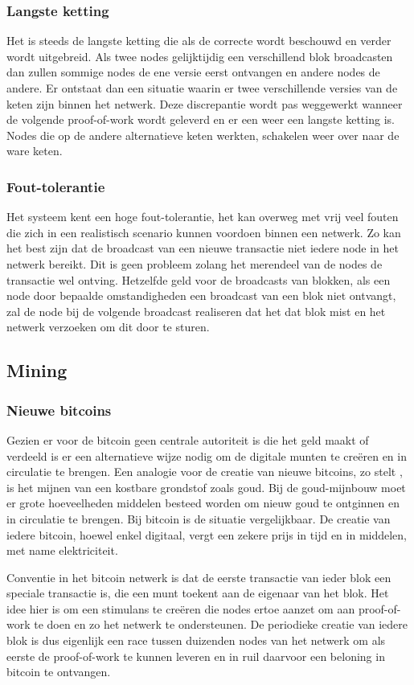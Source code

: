 		\subsubsection{Langste ketting}
		Het is steeds de langste ketting die als de correcte wordt beschouwd en verder wordt uitgebreid. Als twee nodes gelijktijdig een verschillend blok broadcasten dan zullen sommige nodes de ene versie eerst ontvangen en andere nodes de andere. Er ontstaat dan een situatie waarin er twee verschillende versies van de keten zijn binnen het netwerk. Deze discrepantie wordt pas weggewerkt wanneer de volgende proof-of-work wordt geleverd en er een weer een langste ketting is. Nodes die op de andere alternatieve keten werkten, schakelen weer over naar de ware keten.
		\subsubsection{Fout-tolerantie}
		Het systeem kent een hoge fout-tolerantie, het kan overweg met vrij veel fouten die zich in een realistisch scenario  kunnen voordoen binnen een netwerk. Zo kan het best zijn dat de broadcast van een nieuwe transactie niet iedere node in het netwerk bereikt. Dit is geen probleem zolang het merendeel van de nodes de transactie wel ontving. Hetzelfde geld voor de broadcasts van blokken, als een node door bepaalde omstandigheden een broadcast van een blok niet ontvangt, zal de node bij de volgende broadcast realiseren dat het dat blok mist en het netwerk verzoeken om dit door te sturen.
	\subsection{Mining}
		\subsubsection{Nieuwe bitcoins}
		Gezien er voor de bitcoin geen centrale autoriteit is die het geld maakt of verdeeld is er een alternatieve wijze nodig om de digitale munten te creëren en in circulatie te brengen. Een analogie voor de creatie van nieuwe bitcoins, zo stelt \textcite{Nakamoto2008}, is het mijnen van een kostbare grondstof zoals goud. Bij de goud-mijnbouw moet er grote hoeveelheden middelen besteed worden om nieuw goud te ontginnen en in circulatie te brengen. Bij bitcoin is de situatie vergelijkbaar. De creatie van iedere bitcoin, hoewel enkel digitaal, vergt een zekere prijs in tijd en in middelen, met name elektriciteit.
		
		Conventie in het bitcoin netwerk is dat de eerste transactie van ieder blok een speciale transactie is, die een munt toekent aan de eigenaar van het blok. Het idee hier is om een stimulans te creëren die nodes ertoe aanzet om aan proof-of-work te doen en zo het netwerk te ondersteunen. De periodieke creatie van iedere blok is dus eigenlijk een race tussen duizenden nodes van het netwerk om als eerste de proof-of-work te kunnen leveren en in ruil daarvoor een beloning in bitcoin te ontvangen. 
		
